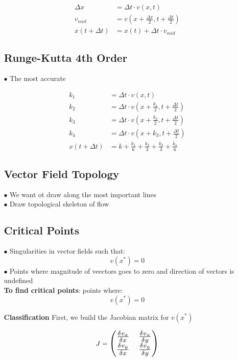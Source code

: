 \begin{align*}
    \Delta x        & = \Delta t \cdot v(x, t)                            \\
    v_{mid}         & = v(x + \frac{\Delta x}{2}, t + \frac{\Delta t}{2}) \\
    x(t + \Delta t) & = x(t) + \Delta t \cdot v_{mid}
\end{align*}

\subsection{Runge-Kutta 4th Order}
$\bullet$ The most accurate

\begin{align*}
    k_1             & = \Delta t \cdot v(x, t)                                            \\
    k_2             & = \Delta t \cdot v(x + \frac{k_1}{2}, t + \frac{\Delta t}{2})       \\
    k_3             & = \Delta t \cdot v(x + \frac{k_2}{2}, t + \frac{\Delta t}{2})       \\
    k_4             & = \Delta t \cdot v(x + k_3, t + \frac{\Delta t}{2})                 \\
    x(t + \Delta t) & = k + \frac{k_1}{6} + \frac{k_2}{3} + \frac{k_3}{3} + \frac{k_4}{6}
\end{align*}

\subsection{Vector Field Topology}
$\bullet$ We want ot draw along the most important lines \\
$\bullet$ Draw topological skeleton of flow \\

\subsection{Critical Points}
$\bullet$ Singularities in vector fields such that: \\
$$v(x^*) = 0$$
$\bullet$ Points where magnitude of veectors goes to zero and direction of vectors is undefined \\

\textbf{To find critical points}: points where:
$$v(x^*) = 0$$

\textbf{Classification}
First, we build the Jacobian matrix for $v(x^*)$

$$J = \Scale[1.3]{\begin{pmatrix}
            \frac{\delta v_x}{\delta x} & \frac{\delta v_x}{\delta y} \\
            \frac{\delta v_y}{\delta x} & \frac{\delta v_y}{\delta y} \\
        \end{pmatrix}}$$

